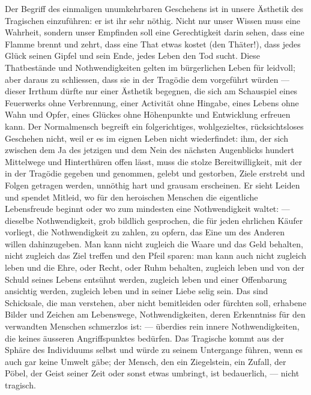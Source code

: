 Der Begriff des einmaligen unumkehrbaren Geschehens ist in unsere Ästhetik des Tragischen einzuführen: er ist ihr sehr nöthig. Nicht nur unser Wissen muss eine Wahrheit, sondern unser Empfinden soll eine Gerechtigkeit darin sehen, dass eine Flamme brennt und zehrt, dass eine That etwas kostet (den Thäter!), dass jedes Glück seinen Gipfel und sein Ende, jedes Leben den Tod sucht. Diese Thatbestände und Nothwendigkeiten gelten im bürgerlichen Leben für leidvoll; aber daraus zu schliessen, dass sie in der Tragödie dem  vorgeführt würden — dieser Irrthum dürfte nur einer Ästhetik begegnen, die sich am Schauspiel eines Feuerwerks ohne Verbrennung, einer Activität ohne Hingabe, eines Lebens ohne Wahn und Opfer, eines Glückes ohne Höhenpunkte und Entwicklung erfreuen kann. Der Normalmensch begreift ein folgerichtiges, wohlgezieltes, rücksichtsloses Geschehen nicht, weil er es im eignen Leben nicht wiederfindet: ihm, der sich zwischen dem Ja des jetzigen und dem Nein des nächsten Augenblicks hundert Mittelwege und Hinterthüren offen lässt, muss die stolze Bereitwilligkeit, mit der in der Tragödie gegeben und genommen, gelebt und gestorben, Ziele erstrebt und Folgen getragen werden, unnöthig hart und grausam erscheinen. Er sieht Leiden und spendet Mitleid, wo für den heroischen Menschen die eigentliche Lebensfreude beginnt oder wo zum mindesten eine Nothwendigkeit waltet: — dieselbe Nothwendigkeit, grob bildlich gesprochen, die für jeden ehrlichen Käufer vorliegt, die Nothwendigkeit zu zahlen, zu opfern, das Eine um des Anderen willen dahinzugeben. Man kann nicht zugleich die Waare und das Geld behalten, nicht zugleich das Ziel treffen und den Pfeil sparen: man kann auch nicht zugleich leben und die Ehre, oder Recht, oder Ruhm behalten, zugleich leben und von der Schuld seines Lebens entsühnt werden, zugleich leben und einer Offenbarung ansichtig werden, zugleich leben und in seiner Liebe selig sein. Das sind Schicksale, die man verstehen, aber nicht bemitleiden oder fürchten soll, erhabene Bilder und Zeichen am Lebenswege, Nothwendigkeiten, deren Erkenntniss für den verwandten Menschen schmerzlos ist: — überdies rein innere Nothwendigkeiten, die keines äusseren Angriffspunktes bedürfen. Das Tragische kommt aus der Sphäre des Individuums selbst und würde zu seinem Untergange führen, wenn es auch gar keine Umwelt gäbe; der Mensch, den ein Ziegelstein, ein Zufall, der Pöbel, der Geist seiner Zeit oder sonst etwas umbringt, ist bedauerlich, — nicht tragisch.
\par

